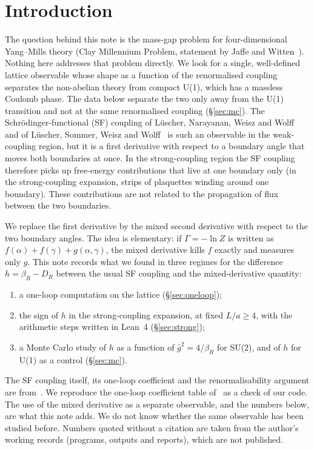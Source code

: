 \documentclass[11pt,a4paper]{article}
\theoremstyle{definition}
\theoremstyle{remark}
\newcommand{\gb}{\bar g^{2}}
\newcommand{\bR}{\beta_R}
\newcommand{\DR}{D_R}
\begin{document}
\section{Introduction}\label{sec:intro}

The question behind this note is the mass-gap problem for four-dimensional Yang--Mills theory (Clay Millennium Problem, statement by Jaffe and Witten~\cite{JW}). Nothing here addresses that problem directly. We look for a single, well-defined lattice observable whose shape as a function of the renormalised coupling separates the non-abelian theory from compact U(1), which has a massless Coulomb phase. The data below separate the two only away from the U(1) transition and not at the same renormalised coupling (\S\ref{sec:mc}). The Schrödinger-functional (SF) coupling of Lüscher, Narayanan, Weisz and Wolff~\cite{LNWW} and of Lüscher, Sommer, Weisz and Wolff~\cite{LSWW} is such an observable in the weak-coupling region, but it is a first derivative with respect to a boundary angle that moves both boundaries at once. In the strong-coupling region the SF coupling therefore picks up free-energy contributions that live at one boundary only (in the strong-coupling expansion, strips of plaquettes winding around one boundary). These contributions are not related to the propagation of flux between the two boundaries.

We replace the first derivative by the mixed second derivative with respect to the two boundary angles. The idea is elementary: if $\Gamma=-\ln Z$ is written as $f(\alpha)+f(\gamma)+g(\alpha,\gamma)$, the mixed derivative kills $f$ exactly and measures only $g$. This note records what we found in three regimes for the difference $h=\bR-\DR$ between the usual SF coupling and the mixed-derivative quantity:
\begin{enumerate}[leftmargin=2em]
\item a one-loop computation on the lattice (\S\ref{sec:oneloop});
\item the sign of $h$ in the strong-coupling expansion, at fixed $L/a\ge4$, with the arithmetic steps written in Lean~4 (\S\ref{sec:strong});
\item a Monte Carlo study of $h$ as a function of $\gb=4/\bR$ for SU(2), and of $h$ for U(1) as a control (\S\ref{sec:mc}).
\end{enumerate}
The SF coupling itself, its one-loop coefficient and the renormalisability argument are from~\cite{LNWW,LSWW}. We reproduce the one-loop coefficient table of~\cite{LNWW} as a check of our code. The use of the mixed derivative as a separate observable, and the numbers below, are what this note adds. We do not know whether the same observable has been studied before. Numbers quoted without a citation are taken from the author's working records (programs, outputs and reports), which are not published.
\end{document}
